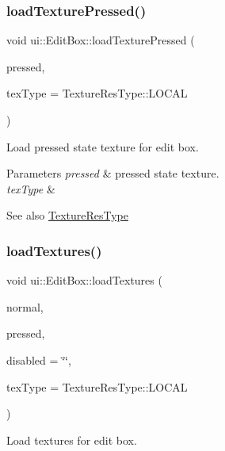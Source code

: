 \subsubsection{\texorpdfstring{load\+Texture\+Pressed()}{loadTexturePressed()}}
{\footnotesize\ttfamily void ui\+::\+Edit\+Box\+::load\+Texture\+Pressed (\begin{DoxyParamCaption}\item[{const std\+::string \&}]{pressed,  }\item[{\hyperlink{classui_1_1Widget_a040a65ec5ad3b11119b7e16b98bd9af0}{Texture\+Res\+Type}}]{tex\+Type = {\ttfamily TextureResType\+:\+:LOCAL} }\end{DoxyParamCaption})}

Load pressed state texture for edit box.


\begin{DoxyParams}{Parameters}
{\em pressed} & pressed state texture. \\
\hline
{\em tex\+Type} & \\
\hline
\end{DoxyParams}
\begin{DoxySeeAlso}{See also}
{\ttfamily \hyperlink{classui_1_1Widget_a040a65ec5ad3b11119b7e16b98bd9af0}{Texture\+Res\+Type}} 
\end{DoxySeeAlso}
\mbox{\label{classui_1_1EditBox_a8618a7f2a642e858e893657b16b89fa9}} 
\subsubsection{\texorpdfstring{load\+Textures()}{loadTextures()}}
{\footnotesize\ttfamily void ui\+::\+Edit\+Box\+::load\+Textures (\begin{DoxyParamCaption}\item[{const std\+::string \&}]{normal,  }\item[{const std\+::string \&}]{pressed,  }\item[{const std\+::string \&}]{disabled = {\ttfamily \char`\"{}\char`\"{}},  }\item[{\hyperlink{classui_1_1Widget_a040a65ec5ad3b11119b7e16b98bd9af0}{Texture\+Res\+Type}}]{tex\+Type = {\ttfamily TextureResType\+:\+:LOCAL} }\end{DoxyParamCaption})}

Load textures for edit box.


